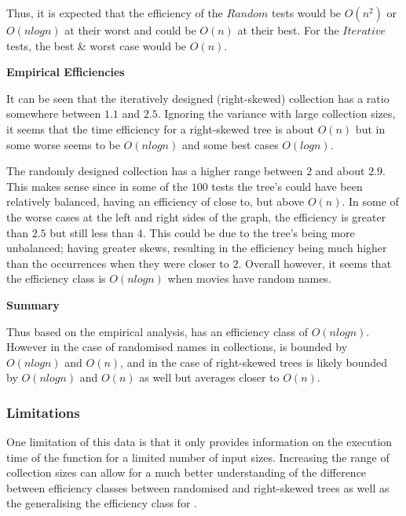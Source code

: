 \documentclass[a4paper]{article}
\begin{document}
\noindent
Thus, it is expected that the efficiency of the $Random$ tests would be $O(n^2)$ or $O(nlogn)$ at their worst and could be $O(n)$ at their best. For the $Iterative$ tests, the best \& worst case would be $O(n)$.
\vspace{3mm}

\noindent
\textbf{Empirical Efficiencies}

\noindent
It can be seen that the iteratively designed (right-skewed) collection has a ratio somewhere between $1.1$ and $2.5$. Ignoring the variance with large collection sizes, it seems that the time efficiency for a right-skewed tree is about $O(n)$ but in some worse seems to be $O(nlogn)$ and some best cases $O(logn)$.
\vspace{3mm}

The randomly designed collection has a higher range between $2$ and about $2.9$. This makes sense since in some of the $100$ tests the tree's could have been relatively balanced, having an efficiency of close to, but above $O(n)$. In some of the worse cases at the left and right sides of the graph, the efficiency is greater than $2.5$ but still less than $4$. This could be due to the tree's being more unbalanced; having greater skews, resulting in the efficiency being much higher than the occurrences when they were closer to $2$. Overall however, it seems that the efficiency class is $O(nlogn)$ when movies have random names. 
\vspace{3mm}

\noindent
\textbf{Summary}

\noindent
Thus based on the empirical analysis,  has an efficiency class of $O(nlogn)$. However in the case of randomised names in collections, is bounded by $O(nlogn)$ and $O(n)$, and in the case of right-skewed trees is likely bounded by $O(nlogn)$ and $O(n)$ as well but averages closer to $O(n)$.

\subsubsection{Limitations}
One limitation of this data is that it only provides information on the execution time of the function for a limited number of input sizes. Increasing the range of collection sizes can allow for a much better understanding of the difference between efficiency classes between randomised and right-skewed trees as well as the generalising the efficiency class for .
\vspace{3mm}
\end{document}
